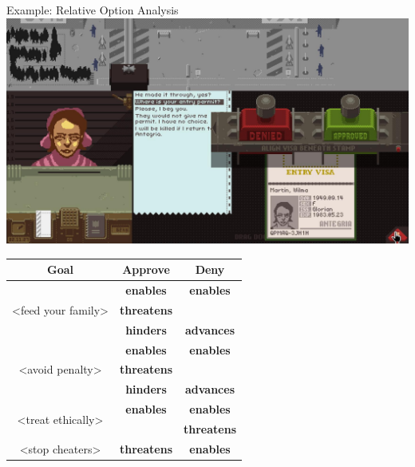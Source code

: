 \documentclass[xcolor=x11names]{beamer}
\begin{document}
\begin{frame}{Example: Relative Option Analysis}
  \centering
  \includegraphics[height=0.3\textheight]{res/papersplease-large.png} \\
  \vspace*{0.2em}
  \footnotesize
  \begin{tabular}{c c c}
    \toprule
    \textbf{Goal} & \textbf{Approve} & \textbf{Deny} \\
    \midrule
    \multirow{3}{*}{<feed your family>} & \textbf{enables} & \textbf{enables} \\
                                        & \textbf{threatens} & \\
                                        & \textbf{hinders} & \textbf{advances} \\
    \midrule

    \multirow{3}{*}{<avoid penalty>} & \textbf{enables} & \textbf{enables} \\
                                     & \textbf{threatens} & \\
                                     & \textbf{hinders} & \textbf{advances} \\
    \midrule

    \multirow{2}{*}{<treat ethically>} & \textbf{enables} & \textbf{enables} \\
                                       & & \textbf{threatens} \\
    \midrule

    <stop cheaters> & \textbf{threatens} & \textbf{enables} \\
    \bottomrule
  \end{tabular}
\end{frame}
\end{document}
